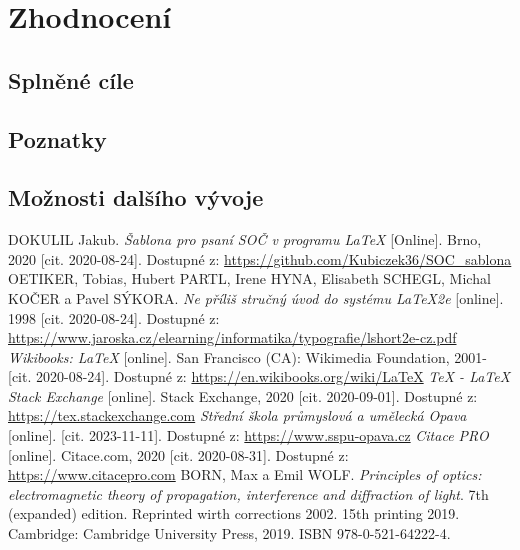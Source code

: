 \documentclass[12pt, a4paper,
twoside,        %
openright
]{report}
\let\oldchapter\chapter
\renewcommand{\chapter}{
	\clearpage
	\pagestyle{fancy}
	\oldchapter
}
\begin{document}
\chapter{Zhodnocení}

\section{Splněné cíle}

\section{Poznatky}

\section{Možnosti dalšího vývoje}




	
	\begin{thebibliography}{99}
		 DOKULIL Jakub. \textit{Šablona pro psaní SOČ v programu \LaTeX} [Online]. Brno, 2020 [cit. 2020-08-24]. Dostupné z: \url{https://github.com/Kubiczek36/SOC_sablona}
		OETIKER, Tobias, Hubert PARTL, Irene HYNA, Elisabeth SCHEGL, Michal KOČER a Pavel SÝKORA. \textit{Ne příliš stručný úvod do systému LaTeX2e} [online]. 1998 [cit. 2020-08-24]. Dostupné z: \url{https://www.jaroska.cz/elearning/informatika/typografie/lshort2e-cz.pdf}
		\textit{Wikibooks: LaTeX} [online]. San Francisco (CA): Wikimedia Foundation, 2001- [cit. 2020-08-24]. Dostupné z: \url{https://en.wikibooks.org/wiki/LaTeX}
		 \textit{TeX - LaTeX Stack Exchange} [online]. Stack Exchange, 2020 [cit. 2020-09-01]. Dostupné z: \url{https://tex.stackexchange.com}
		 \textit{Střední škola průmyslová a umělecká Opava} [online]. [cit. 2023-11-11]. Dostupné z: \url{https://www.sspu-opava.cz}
		\textit{Citace PRO} [online]. Citace.com, 2020 [cit. 2020-08-31]. Dostupné z: \url{https://www.citacepro.com}
		 BORN, Max a Emil WOLF. \textit{Principles of optics: electromagnetic theory of propagation, interference and diffraction of light}. 7th (expanded) edition. Reprinted wirth corrections 2002. 15th printing 2019. Cambridge: Cambridge University Press, 2019. ISBN 978-0-521-64222-4.
	\end{thebibliography}
	
	\listoffigures
	
	\listoftables
	
	\appendix %
	
	\titleformat{\chapter}[block]{\scshape\bfseries\LARGE}{Příloha \thechapter}{10pt}{\vspace{0pt}}[\vspace{-22pt}] %
	

	
	
\end{document}
